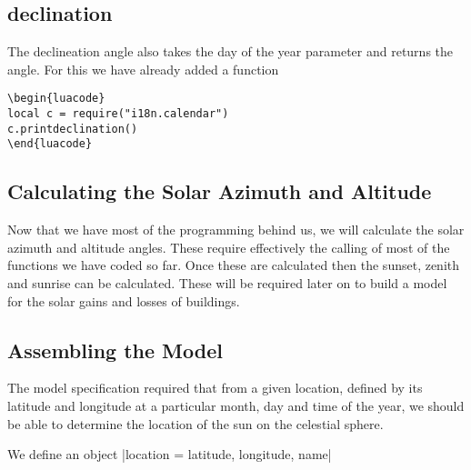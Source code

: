 \subsection{declination}

The declineation angle also takes the day of the year parameter and returns the angle. For this we have already
added a function

\begin{scriptexample}{}{}
\begin{verbatim}
\begin{luacode}
local c = require("i18n.calendar")
c.printdeclination()
\end{luacode}
\end{verbatim}
\end{scriptexample}

\subsection{Calculating the Solar Azimuth and Altitude}

Now that we have most of the programming behind us, we will calculate the solar azimuth and altitude angles. These require effectively the calling of most of the functions we have coded so far. Once these are calculated then the sunset, zenith and sunrise can be calculated. These will be required later on to build a model for the solar gains and losses of buildings. 

\subsection{Assembling the Model}

The model specification required that from a given location, defined by its latitude and longitude at a particular month, day and time of the year, we should be able to determine the location of the sun on the celestial sphere.

We define an object |location = {latitude, longitude, name}| 











